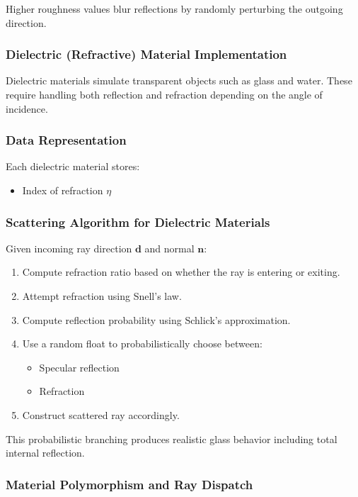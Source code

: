 \documentclass[11pt]{article}
\begin{document}
Higher roughness values blur reflections by randomly perturbing the outgoing direction.

\subsubsection{Dielectric (Refractive) Material Implementation}

Dielectric materials simulate transparent objects such as glass and water. These require handling both reflection and refraction depending on the angle of incidence.

\subsubsection{Data Representation}

Each dielectric material stores:
\begin{itemize}
    \item Index of refraction $\eta$
\end{itemize}

\subsubsection{Scattering Algorithm for Dielectric Materials}

Given incoming ray direction $\mathbf{d}$ and normal $\mathbf{n}$:
\begin{enumerate}
    \item Compute refraction ratio based on whether the ray is entering or exiting.
    \item Attempt refraction using Snell's law.
    \item Compute reflection probability using Schlick's approximation.
    \item Use a random float to probabilistically choose between:
    \begin{itemize}
        \item Specular reflection
        \item Refraction
    \end{itemize}
    \item Construct scattered ray accordingly.
\end{enumerate}

This probabilistic branching produces realistic glass behavior including total internal reflection.

\subsubsection{Material Polymorphism and Ray Dispatch}
\end{document}
